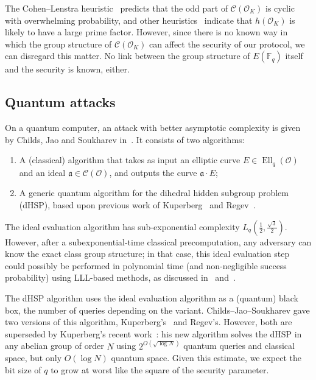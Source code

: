 \documentclass{llncs}
\newcommand{\F}{\mathbb{F}}
\newcommand{\Cl}{\mathcal{C}}
\renewcommand{\O}{\mathcal{O}}
\renewcommand{\frak}{\mathfrak}
\DeclareMathOperator{\Ell}{Ell}
\begin{document}
\begin{remark}
  The Cohen--Lenstra heuristic~\cite{10.1007/BFb0099440} predicts that
  the odd part of $\Cl(\O_K)$ is cyclic with overwhelming
  probability, and other heuristics~\cite{10.1007/3-540-44448-3_18}
  indicate that $h(\O_K)$ is likely to have a large prime factor.
  However, since there is no known way in which the group structure of
  $\Cl(\O_K)$ can affect the security of our protocol, we can 
  disregard this matter. No link between the group structure
	of $E(\F_q)$ itself and the security is known, either.
\end{remark}

\subsection{Quantum attacks}
\label{sec:quantum-attacks}

On a quantum computer, an attack with better asymptotic complexity is
given by Childs, Jao and Soukharev
in~\cite{childs2014constructing}. It consists of two algorithms:
\begin{enumerate}
\item A (classical) algorithm that takes as input an elliptic curve
  $E∈\Ell_q(\O)$ and an ideal $\frak a∈\Cl(\O)$, and outputs the curve
  $\frak a·E$;
\item A generic quantum algorithm for the dihedral hidden subgroup
  problem (dHSP), based upon previous work of Kuperberg~\cite{Kup,Kuperberg2013} and
  Regev~\cite{regev04}.
\end{enumerate}

The ideal evaluation algorithm has sub-exponential complexity
$L_q(\frac{1}{2},\frac{\sqrt{3}}{2})$. However, after a subexponential-time
classical precomputation, any adversary can know the exact class group structure;
in that case, this ideal evaluation step could possibly be performed in polynomial
time (and non-negligible success probability)
using LLL-based methods, as discussed in~\cite{Stolbunov2012}
and~\cite[\S5]{cryptoeprint:2006:291}.

The dHSP algorithm uses the
ideal evaluation algorithm as a (quantum) black box, the number of
queries depending on the variant. Childs--Jao--Soukharev gave two
versions of this algorithm, Kuperberg's~\cite{Kup} and Regev's\cite{regev04}.
However, both are superseded by Kuperberg's recent work~\cite{Kuperberg2013}:
his new algorithm solves the dHSP in any abelian group of order $N$
using $2^{O(\sqrt{\log N})}$ quantum queries and classical space,
but only $O(\log N)$ quantum space. 
Given this estimate, we expect the bit size of $q$ to grow at
worst like the square of the security parameter.
\end{document}

